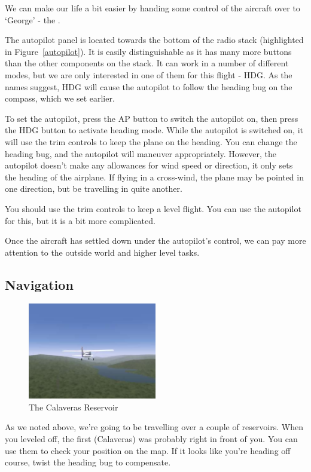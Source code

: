We can make our life a bit easier by handing some control of the aircraft over
to `George' - the .

The autopilot panel is located towards the bottom of the radio stack
(highlighted in Figure~\ref{autopilot}). It is easily distinguishable as
it has many more buttons than the other components on the stack. It can
work in a number of different modes, but we are only interested in one of
them for this flight - HDG. As the names suggest, HDG will cause the
autopilot to follow the heading bug on the compass, which we set earlier.

To set the autopilot, press the AP button to switch the autopilot on,
then press the HDG button to activate heading mode. While the autopilot
is switched on, it will use the trim controls to keep the
plane on the heading. You can change the heading bug, and the autopilot
will maneuver appropriately. However, the autopilot doesn't make any
allowances for wind speed or direction, it only sets the heading of
the airplane. If flying in a cross-wind, the plane may be pointed in
one direction, but be travelling in quite another.

You should use the trim controls to keep a level flight. You can use
the autopilot for this, but it is a bit more complicated.

Once the aircraft has settled down under the autopilot's control, we
can pay more attention to the outside world and higher level tasks.

\subsection{Navigation}

\begin{figure}[!htp]
\centering
\includegraphics[width=0.5\textwidth]{calaveras1}
\caption{The Calaveras Reservoir}
\end{figure}

As we noted above, we're going to be travelling over a couple of reservoirs.
When you leveled off, the first (Calaveras) was probably right in front of you.
You can use them to check your position on the map. If it looks like you're
heading off course, twist the heading bug to compensate.

